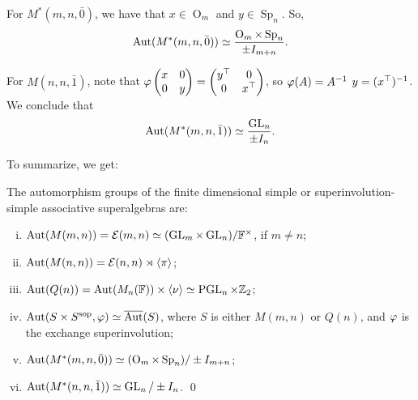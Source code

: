 For $M^*(m,n, \bar 0)$, 
we have that 
$x \in \operatorname{O}_m$ and $y \in \operatorname{Sp}_n$. 
So, 
\[
    \operatorname{Aut}(M^*(m,n, \bar 0)) \simeq \frac{\operatorname{O}_m \times \operatorname{Sp}_n}{\pm I_{m+n}}.
\] 

For $M(n,n, \bar 1)$, note that 
$\vphi %
\begin{pmatrix}
    x & 0\\
    0 & y
\end{pmatrix}
= 
\begin{pmatrix}
    y\transp & 0\\
    0 & x\transp
\end{pmatrix}$, so $\varphi(A) = A^{-1}$ \IFF $y = (x^{\top})^{-1}$. 
We conclude that
\[
    \operatorname{Aut}(M^*(m,n, \bar 1)) \simeq \frac{\operatorname{GL}_n}{ \pm I_n}. 
\]

To summarize, we get:

\begin{prop}\label{prop:Aut-associative}
    The automorphism groups of the finite dimensional simple or superinvolution-simple associative superalgebras are: 
    \begin{enumerate}[(i)]
        \item $\operatorname{Aut}(M(m,n)) = \mathcal E(m,n) \simeq (\operatorname{GL}_m \times \operatorname{GL}_n)/\mathbb{F}^\times$, if $m\neq n$;
        \item $\operatorname{Aut}(M(n,n)) = \mathcal E(n,n) \rtimes \langle \pi \rangle$;
        \item $\operatorname{Aut}(Q(n)) = \operatorname{Aut}(M_n(\mathbb{F})) \times \langle \nu \rangle \simeq \operatorname{PGL}_n \times \mathbb{Z}_2$;
        \item $\operatorname{Aut}(S\times S^{\mathrm{sop}}, \varphi) \simeq \overline{\operatorname{Aut}}(S)$, where $S$ is either $M(m,n)$ or $Q(n)$, and $\varphi$ is the exchange superinvolution;
        \item $\operatorname{Aut}(M^*(m,n, \bar 0)) \simeq (\operatorname{O}_m \times \operatorname{Sp}_n)/\pm I_{m+n}$;
        \item $\operatorname{Aut}(M^*(n,n, \bar 1)) \simeq \operatorname{GL}_n/\pm I_n$. \qed
    \end{enumerate}
\end{prop}


